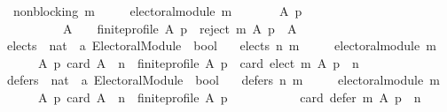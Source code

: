 \begin{isabellebody}
\ \ {\isachardoublequoteopen}non{\isacharunderscore}{\kern0pt}blocking\ m\ {\isasymequiv}\isanewline
\ \ \ \ electoral{\isacharunderscore}{\kern0pt}module\ m\ {\isasymand}\isanewline
\ \ \ \ \ \ {\isacharparenleft}{\kern0pt}{\isasymforall}A\ p{\isachardot}{\kern0pt}\isanewline
\ \ \ \ \ \ \ \ \ \ {\isacharparenleft}{\kern0pt}{\isacharparenleft}{\kern0pt}A\ {\isasymnoteq}\ {\isacharbraceleft}{\kern0pt}{\isacharbraceright}{\kern0pt}\ {\isasymand}\ finite{\isacharunderscore}{\kern0pt}profile\ A\ p{\isacharparenright}{\kern0pt}\ {\isasymlongrightarrow}\ reject\ m\ A\ p\ {\isasymnoteq}\ A{\isacharparenright}{\kern0pt}{\isacharparenright}{\kern0pt}{\isachardoublequoteclose}\isanewline
\isanewline
\isanewline
\isanewline
{}\isamarkupfalse%
\ elects\ {\isacharcolon}{\kern0pt}{\isacharcolon}{\kern0pt}\ {\isachardoublequoteopen}nat\ {\isasymRightarrow}\ {\isacharprime}{\kern0pt}a\ Electoral{\isacharunderscore}{\kern0pt}Module\ {\isasymRightarrow}\ bool{\isachardoublequoteclose}\ \isanewline
\ \ {\isachardoublequoteopen}elects\ n\ m\ {\isasymequiv}\isanewline
\ \ \ \ electoral{\isacharunderscore}{\kern0pt}module\ m\ {\isasymand}\isanewline
\ \ \ \ \ \ {\isacharparenleft}{\kern0pt}{\isasymforall}A\ p{\isachardot}{\kern0pt}\ {\isacharparenleft}{\kern0pt}card\ A\ {\isasymge}\ n\ {\isasymand}\ finite{\isacharunderscore}{\kern0pt}profile\ A\ p{\isacharparenright}{\kern0pt}\ {\isasymlongrightarrow}\ card\ {\isacharparenleft}{\kern0pt}elect\ m\ A\ p{\isacharparenright}{\kern0pt}\ {\isacharequal}{\kern0pt}\ n{\isacharparenright}{\kern0pt}{\isachardoublequoteclose}\isanewline
\isanewline
\isanewline
{}\isamarkupfalse%
\ defers\ {\isacharcolon}{\kern0pt}{\isacharcolon}{\kern0pt}\ {\isachardoublequoteopen}nat\ {\isasymRightarrow}\ {\isacharprime}{\kern0pt}a\ Electoral{\isacharunderscore}{\kern0pt}Module\ {\isasymRightarrow}\ bool{\isachardoublequoteclose}\ \isanewline
\ \ {\isachardoublequoteopen}defers\ n\ m\ {\isasymequiv}\isanewline
\ \ \ \ electoral{\isacharunderscore}{\kern0pt}module\ m\ {\isasymand}\isanewline
\ \ \ \ \ \ {\isacharparenleft}{\kern0pt}{\isasymforall}A\ p{\isachardot}{\kern0pt}\ {\isacharparenleft}{\kern0pt}card\ A\ {\isasymge}\ n\ {\isasymand}\ finite{\isacharunderscore}{\kern0pt}profile\ A\ p{\isacharparenright}{\kern0pt}\ {\isasymlongrightarrow}\isanewline
\ \ \ \ \ \ \ \ \ \ card\ {\isacharparenleft}{\kern0pt}defer\ m\ A\ p{\isacharparenright}{\kern0pt}\ {\isacharequal}{\kern0pt}\ n{\isacharparenright}{\kern0pt}{\isachardoublequoteclose}\isanewline
\isanewline
\isanewline
{}\isamarkupfalse%

\end{isabellebody}
